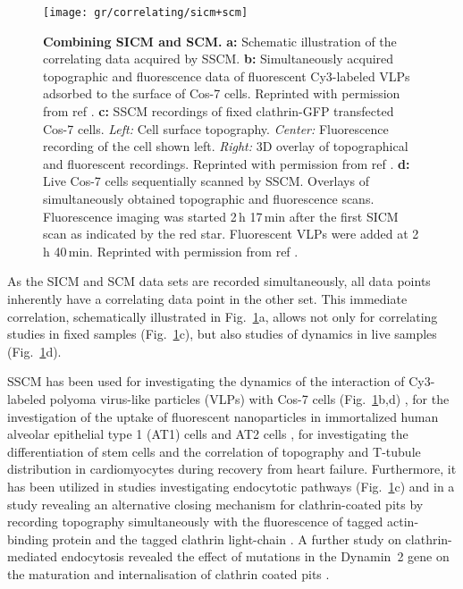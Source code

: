 \begin{figure}
  \texttt{[image: gr/correlating/sicm+scm]}
  \caption{%
    \textbf{Combining SICM and SCM.}
    \textbf{a:} Schematic illustration of the correlating data acquired by SSCM.
    \textbf{b:} Simultaneously acquired topographic and fluorescence data of fluorescent Cy3-labeled 
    VLPs adsorbed to the surface of Cos-7 cells. Reprinted with permission from ref \cite{Gorelik2002a}.
    \textbf{c:} SSCM recordings of fixed clathrin-GFP transfected Cos-7 cells. 
    	\textit{Left:} Cell surface topography. 
    	\textit{Center:} Fluorescence recording of the cell shown left. 
    	\textit{Right:} 3D overlay of topographical and fluorescent recordings. 
    Reprinted with permission from ref \cite{Shevchuk2008}.
    \textbf{d:} Live Cos-7 cells sequentially scanned by SSCM. Overlays of simultaneously obtained 
    topographic and fluorescence scans. Fluorescence imaging was started 2\,h 17\,min after the first 
    SICM scan as indicated by the red star. Fluorescent VLPs were added at 2\,h 40\,min. 
    Reprinted with permission from ref \cite{Gorelik2002}.
  }
  \label{fig:sicm+scm}
\end{figure}

As the SICM and SCM data sets are recorded simultaneously, all data points inherently have a
correlating data point in the other set. This immediate correlation, schematically illustrated in
Fig.~\ref{fig:sicm+scm}a, allows not only for correlating studies in fixed
samples (Fig.~\ref{fig:sicm+scm}c), but also studies of dynamics in live
samples (Fig.~\ref{fig:sicm+scm}d).


SSCM has been used for investigating the dynamics of the interaction of
Cy3-labeled polyoma virus-like particles (VLPs) with Cos-7 cells
(Fig.~\ref{fig:sicm+scm}b,d) \cite{Gorelik2002a}, for the investigation of the
uptake of fluorescent nanoparticles in immortalized human alveolar epithelial
type 1 (AT1) cells and AT2 cells \cite{Kemp2008,Novak2014}, for investigating
the differentiation of stem cells \cite{Gorelik2008} and the correlation of
topography and T-tubule distribution in cardiomyocytes \cite{Lyon2012} during
recovery from heart failure. Furthermore, it has been utilized in studies
investigating endocytotic pathways \cite{Shevchuk2008}
(Fig.~\ref{fig:sicm+scm}c) and in a study revealing an alternative closing
mechanism for clathrin-coated pits by recording topography simultaneously with
the fluorescence of tagged actin-binding protein and the tagged clathrin
light-chain \cite{Shevchuk2012}. A further study on clathrin-mediated
endocytosis revealed the effect of mutations in the Dynamin~2 gene on the
maturation and internalisation of clathrin coated pits \cite{Ali2019}.

